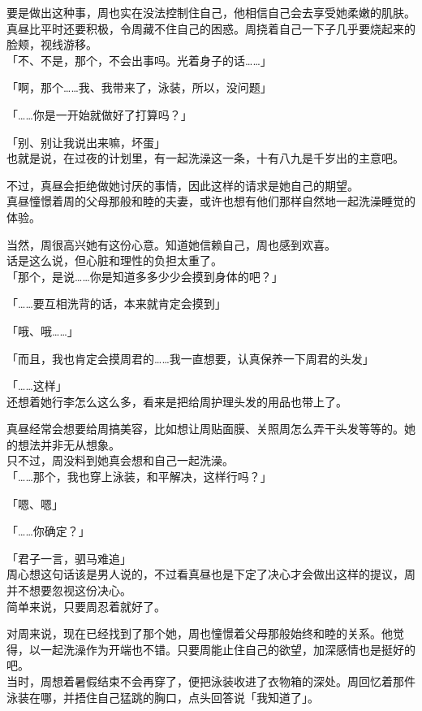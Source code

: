 要是做出这种事，周也实在没法控制住自己，他相信自己会去享受她柔嫩的肌肤。\\

真昼比平时还要积极，令周藏不住自己的困惑。周挠着自己一下子几乎要烧起来的脸颊，视线游移。\\

「不、不是，那个，不会出事吗。光着身子的话……」

「啊，那个……我、我带来了，泳装，所以，没问题」

「……你是一开始就做好了打算吗？」

「别、别让我说出来嘛，坏蛋」\\

也就是说，在过夜的计划里，有一起洗澡这一条，十有八九是千岁出的主意吧。

不过，真昼会拒绝做她讨厌的事情，因此这样的请求是她自己的期望。\\

真昼憧憬着周的父母那般和睦的夫妻，或许也想有他们那样自然地一起洗澡睡觉的体验。

当然，周很高兴她有这份心意。知道她信赖自己，周也感到欢喜。\\

话是这么说，但心脏和理性的负担太重了。\\

「那个，是说……你是知道多多少少会摸到身体的吧？」

「……要互相洗背的话，本来就肯定会摸到」

「哦、哦……」

「而且，我也肯定会摸周君的……我一直想要，认真保养一下周君的头发」

「……这样」\\

还想着她行李怎么这么多，看来是把给周护理头发的用品也带上了。

真昼经常会想要给周搞美容，比如想让周贴面膜、关照周怎么弄干头发等等的。她的想法并非无从想象。\\

只不过，周没料到她真会想和自己一起洗澡。\\

「……那个，我也穿上泳装，和平解决，这样行吗？」

「嗯、嗯」

「……你确定？」

「君子一言，驷马难追」\\

周心想这句话该是男人说的，不过看真昼也是下定了决心才会做出这样的提议，周并不想要忽视这份决心。\\

简单来说，只要周忍着就好了。

对周来说，现在已经找到了那个她，周也憧憬着父母那般始终和睦的关系。他觉得，以一起洗澡作为开端也不错。只要周能止住自己的欲望，加深感情也是挺好的吧。\\

当时，周想着暑假结束不会再穿了，便把泳装收进了衣物箱的深处。周回忆着那件泳装在哪，并捂住自己猛跳的胸口，点头回答说「我知道了」。
